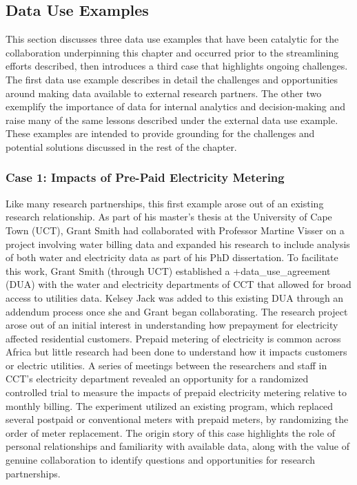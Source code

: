 \documentclass[
]{book}
\begin{document}
\hypertarget{data-use-examples-6}{%
\subsection{Data Use Examples}\label{data-use-examples-6}}

This section discusses three data use examples that have been catalytic for the collaboration underpinning this chapter and occurred prior to the streamlining efforts described, then introduces a third case that highlights ongoing challenges. The first data use example describes in detail the challenges and opportunities around making data available to external research partners. The other two exemplify the importance of data for internal analytics and decision-making and raise many of the same lessons described under the external data use example. These examples are intended to provide grounding for the challenges and potential solutions discussed in the rest of the chapter.

\hypertarget{case-1-impacts-of-pre-paid-electricity-metering}{%
\subsubsection*{Case 1: Impacts of Pre-Paid Electricity Metering}\label{case-1-impacts-of-pre-paid-electricity-metering}}

Like many research partnerships, this first example arose out of an existing research relationship. As part of his master's thesis at the University of Cape Town (UCT), Grant Smith had collaborated with Professor Martine Visser on a project involving water billing data \citep{smith2014} and expanded his research to include analysis of both water and electricity data as part of his PhD dissertation. To facilitate this work, Grant Smith (through UCT) established a +data\_use\_agreement\textbar{} (DUA) with the water and electricity departments of CCT that allowed for broad access to utilities data. Kelsey Jack was added to this existing DUA through an addendum process once she and Grant began collaborating. The research project arose out of an initial interest in understanding how prepayment for electricity affected residential customers. Prepaid metering of electricity is common across Africa but little research had been done to understand how it impacts customers or electric utilities. A series of meetings between the researchers and staff in CCT's electricity department revealed an opportunity for a randomized controlled trial to measure the impacts of prepaid electricity metering relative to monthly billing. The experiment utilized an existing program, which replaced several postpaid or conventional meters with prepaid meters, by randomizing the order of meter replacement. The origin story of this case highlights the role of personal relationships and familiarity with available data, along with the value of genuine collaboration to identify questions and opportunities for research partnerships.
\end{document}
